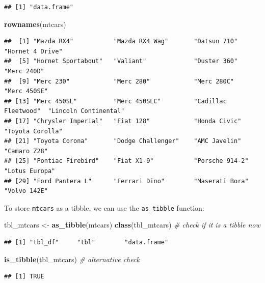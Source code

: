\documentclass[
  12pt,
  oneside]{book}
\newenvironment{Shaded}{\begin{snugshade}}{\end{snugshade}}
\newcommand{\CommentTok}[1]{\textcolor[rgb]{0.56,0.35,0.01}{\textit{#1}}}
\newcommand{\FunctionTok}[1]{\textcolor[rgb]{0.13,0.29,0.53}{\textbf{#1}}}
\newcommand{\NormalTok}[1]{#1}
\newcommand{\OtherTok}[1]{\textcolor[rgb]{0.56,0.35,0.01}{#1}}
\begin{document}
\begin{verbatim}
## [1] "data.frame"
\end{verbatim}

\begin{Shaded}
\begin{Highlighting}[]
\FunctionTok{rownames}\NormalTok{(mtcars) }
\end{Highlighting}
\end{Shaded}

\begin{verbatim}
##  [1] "Mazda RX4"           "Mazda RX4 Wag"       "Datsun 710"          "Hornet 4 Drive"     
##  [5] "Hornet Sportabout"   "Valiant"             "Duster 360"          "Merc 240D"          
##  [9] "Merc 230"            "Merc 280"            "Merc 280C"           "Merc 450SE"         
## [13] "Merc 450SL"          "Merc 450SLC"         "Cadillac Fleetwood"  "Lincoln Continental"
## [17] "Chrysler Imperial"   "Fiat 128"            "Honda Civic"         "Toyota Corolla"     
## [21] "Toyota Corona"       "Dodge Challenger"    "AMC Javelin"         "Camaro Z28"         
## [25] "Pontiac Firebird"    "Fiat X1-9"           "Porsche 914-2"       "Lotus Europa"       
## [29] "Ford Pantera L"      "Ferrari Dino"        "Maserati Bora"       "Volvo 142E"
\end{verbatim}

To store \texttt{mtcars} as a tibble, we can use the \texttt{as\_tibble} function:

\begin{Shaded}
\begin{Highlighting}[]
\NormalTok{tbl\_mtcars }\OtherTok{\textless{}{-}} \FunctionTok{as\_tibble}\NormalTok{(mtcars)}
\FunctionTok{class}\NormalTok{(tbl\_mtcars) }\CommentTok{\# check if it is a tibble now}
\end{Highlighting}
\end{Shaded}

\begin{verbatim}
## [1] "tbl_df"     "tbl"        "data.frame"
\end{verbatim}

\begin{Shaded}
\begin{Highlighting}[]
\FunctionTok{is\_tibble}\NormalTok{(tbl\_mtcars) }\CommentTok{\# alternative check}
\end{Highlighting}
\end{Shaded}

\begin{verbatim}
## [1] TRUE
\end{verbatim}
\end{document}
